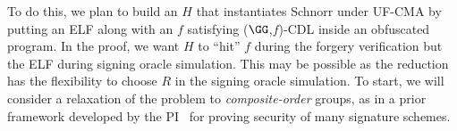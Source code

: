 To do this, we  plan to  build an $H$ that instantiates Schnorr under UF-CMA by putting an ELF along with an  $f$ satisfying ($\GG$,$f$)-CDL inside an obfuscated program. In the proof, we want $H$ to ``hit'' $f$ during the forgery verification but the ELF during signing oracle simulation. This may be possible as the reduction has the flexibility to choose $R$  in the signing oracle simulation.  %
To start, we will consider a relaxation  of the problem to  \emph{composite-order} groups, as in a prior framework developed by the PI~\cite{AC:GLOW12} for proving security of many signature schemes. %


\fi
  
  


 


